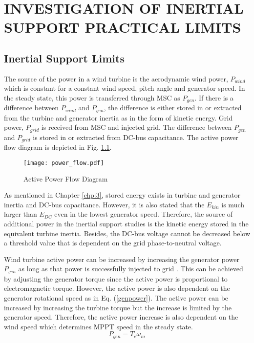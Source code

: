 \chapter{INVESTIGATION OF INERTIAL SUPPORT PRACTICAL LIMITS}
\label{chp:4}
\section{Inertial Support Limits}
\label{sec:klimit}
The source of the power in a wind turbine is the aerodynamic wind power, $P_{wind}$ which is constant for a constant wind speed, pitch angle and generator speed. In the steady state, this power is transferred through MSC as $P_{gen}$. If there is a difference between $P_{wind}$ and $P_{gen}$, the difference is either stored in or extracted from the turbine and generator inertia as in the form of kinetic energy. Grid power, $P_{grid}$ is received from MSC and injected grid. The difference between $P_{gen}$ and $P_{grid}$ is stored in or extracted from DC-bus capacitance. The active power flow diagram is depicted in Fig. \ref{power_flow}. \par
\begin{figure}[h]
	\centering
	\texttt{[image: power\_flow.pdf]}
	\caption{Active Power Flow Diagram}
	\label{power_flow}
\end{figure}
As mentioned in Chapter \ref{chp:3}, stored energy exists in turbine and generator inertia and DC-bus capacitance. However, it is also stated that the $E_{kin}$ is much larger than $E_{DC}$ even in the lowest generator speed. Therefore, the source of additional power in the inertial support studies is the kinetic energy stored in the equivalent turbine inertia. Besides, the DC-bus voltage cannot be decreased below a threshold value that is dependent on the grid phase-to-neutral voltage.\par
Wind turbine active power can be increased by increasing the generator power $P_{gen}$ as long as that power is successfully injected to grid . This can be achieved by adjusting the generator torque since the active power is proportional to electromagnetic torque. However, the active power is also dependent on the generator rotational speed as in Eq. (\ref{genpower}). The active power can be increased by increasing the turbine torque but the increase is limited by the generator speed. Therefore, the active power increase is also dependent on the wind speed which determines MPPT speed in the steady state.
\begin{equation}
P_{gen}=T_{e} \omega_{m}
\label{genpower}
\end{equation}

